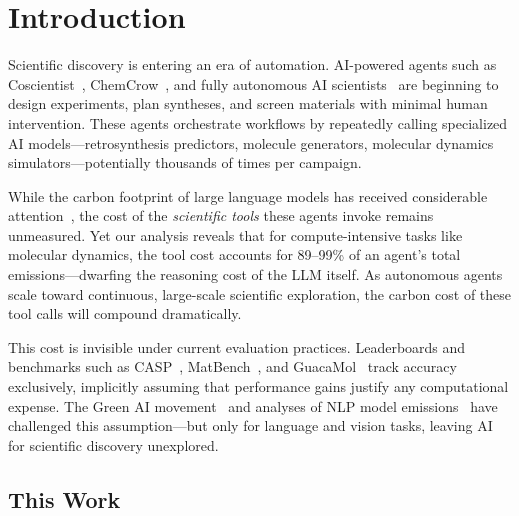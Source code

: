 \documentclass{article}
\theoremstyle{plain}
\theoremstyle{definition}
\theoremstyle{remark}
\begin{document}
\section{Introduction}

Scientific discovery is entering an era of automation. AI-powered agents such as Coscientist~\cite{boiko2023autonomous}, ChemCrow~\cite{bran2024augmenting}, and fully autonomous AI scientists~\cite{lu2024aiscientist} are beginning to design experiments, plan syntheses, and screen materials with minimal human intervention. These agents orchestrate workflows by repeatedly calling specialized AI models---retrosynthesis predictors, molecule generators, molecular dynamics simulators---potentially thousands of times per campaign.

While the carbon footprint of large language models has received considerable attention~\cite{strubell2019energy, luccioni2024power}, the cost of the \textit{scientific tools} these agents invoke remains unmeasured. Yet our analysis reveals that for compute-intensive tasks like molecular dynamics, the tool cost accounts for 89--99\% of an agent's total emissions---dwarfing the reasoning cost of the LLM itself. As autonomous agents scale toward continuous, large-scale scientific exploration, the carbon cost of these tool calls will compound dramatically.

This cost is invisible under current evaluation practices. Leaderboards and benchmarks such as CASP~\cite{kryshtafovych2019critical}, MatBench~\cite{dunn2020benchmarking, riebesell2025framework}, and GuacaMol~\cite{brown2019guacamol} track accuracy exclusively, implicitly assuming that performance gains justify any computational expense. The Green AI movement~\cite{schwartz2020green} and analyses of NLP model emissions~\cite{strubell2019energy, bender2021dangers} have challenged this assumption---but only for language and vision tasks, leaving AI for scientific discovery unexplored.

\subsection{This Work}
\end{document}
